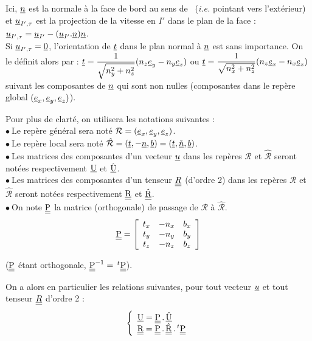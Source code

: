 Ici, $\underline{n}$ est la normale \`a la face de bord au sens de \CS\ ({\em i.e.}
pointant vers l'ext\'erieur) et $\underline{u}_{I',\tau}$ est la projection de la
vitesse en $I'$ dans le plan de la face :
$\underline{u}_{I',\tau}=\underline{u}_{I'}-(\underline{u}_{I'}.\underline{n})\underline{n}$.\\
Si $\underline{u}_{I',\tau}=\underline{0}$, l'orientation de $\underline{t}$ dans le plan
normal \`a $\underline{n}$ est sans importance. On le d\'efinit alors par :
$\displaystyle\underline{t}=\frac{1}{\sqrt{n_y^2+n_z^2}}(n_z\underline{e}_y-n_y\underline{e}_z)$
ou
$\displaystyle\underline{t}=\frac{1}{\sqrt{n_x^2+n_z^2}}(n_z\underline{e}_x-n_x\underline{e}_z)$
suivant les composantes de $\underline{n}$ qui sont non nulles (composantes dans le
rep\`ere global $(\underline{e}_x,\underline{e}_y,\underline{e}_z)$).


Pour plus de clart\'e, on utilisera les notations suivantes :\\
$\bullet\ $Le rep\`ere g\'en\'eral sera not\'e
$\mathcal{R}=(\underline{e}_x,\underline{e}_y,\underline{e}_z)$.\\
$\bullet\ $Le rep\`ere local sera not\'e
$\hat{\mathcal{R}}=(\underline{t},-\underline{n},\underline{b})=(\underline{t},\underline{\tilde{n}},\underline{b})$.\\
$\bullet\ $Les matrices des composantes d'un vecteur $\underline{u}$ dans les rep\`eres
$\mathcal{R}$ et $\hat{\mathcal{R}}$ seront not\'ees respectivement
$\underline{\textrm{U}}$ et $\hat{\underline{\textrm{U}}}$.\\
$\bullet\ $Les matrices des composantes d'un tenseur $\underline{\underline{R}}$ (d'ordre 2) dans
les rep\`eres $\mathcal{R}$ et $\hat{\mathcal{R}}$ seront not\'ees
respectivement $\underline{\underline{\textrm{R}}}$ et $\hat{\underline{\underline{\textrm{R}}}}$.\\
$\bullet\ $On note $\underline{\underline{\textrm{P}}}$ la matrice (orthogonale) de passage de $\mathcal{R}$ \`a
$\hat{\mathcal{R}}$.
\begin{equation}
\underline{\underline{\textrm{P}}}=\left[
\begin{array}{ccc}
t_x & -n_x & b_x\\
t_y & -n_y & b_y\\
t_z & -n_z & b_z
\end{array}\right]
\end{equation}

($\underline{\underline{\textrm{P}}}$ \'etant orthogonale, $\underline{\underline{\textrm{P}}}^{-1}=\,^t\underline{\underline{\textrm{P}}}$).

On a alors en particulier les relations suivantes, pour tout vecteur $\underline{u}$
et tout tenseur $\underline{\underline{R}}$ d'ordre 2 :\\
\begin{equation}
\left\{\begin{array}{l}
\underline{\textrm{U}} = \underline{\underline{\textrm{P}}}\,.\,\hat{\underline{\textrm{U}}}\\
\underline{\underline{\textrm{R}}}= \underline{\underline{\textrm{P}}}\,.\,\hat{\underline{\underline{\textrm{R}}}}\,.\,^t\underline{\underline{\textrm{P}}}
\end{array}\right.
\end{equation}

